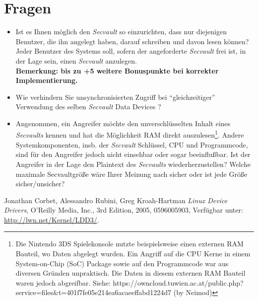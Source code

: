 \documentclass{article}
\begin{document}
\section*{Fragen}
\begin{itemize}
\item Ist es Ihnen m{\"o}glich den \emph{Secvault} so einzurichten,
  dass nur diejenigen Benutzer, die ihn angelegt haben, darauf
  schreiben und davon lesen k{\"o}nnen? Jeder Benutzer des Systems
  soll, sofern der angeforderte \emph{Secvault} frei ist, in der Lage
  sein, einen \emph{Secvault} anzulegen.\\
  {\bf Bemerkung: bis zu +5 weitere Bonuspunkte bei korrekter
    Implementierung.}
\item Wie verhindern Sie unsynchronisierten Zugriff bei
  "`gleichzeitiger"' Verwendung des selben \emph{Secvault} Data
  Devices ?
\item Angenommen, ein Angreifer m{\"o}chte den unverschl{\"u}sselten
  Inhalt eines \emph{Secvaults} kennen und hat die M{\"o}glichkeit RAM direkt
  auszulesen\footnote{
    Die Nintendo 3DS Spielekonsole nutzte beispielsweise einen externen
    RAM Bauteil, wo Daten abgelegt wurden. Ein Angriff auf die CPU Kerne
    in einem System-on-Chip (SoC) Package sowie auf den Programmcode war
    aus diversen Gr{\"u}nden unpraktisch. Die Daten in diesem externen
  RAM Bauteil waren jedoch abgreifbar. Siehe:
  https://owncloud.tuwien.ac.at/public.php?service=files\&t=401f7fe05e214ea6acaeeffabd1224d7
(by Neimod)}. Andere Systemkomponenten, insb. der \emph{Secvault} Schl{\"u}ssel,
CPU und Programmcode, sind f{\"u}r den Angreifer jedoch nicht einsehbar
oder sogar beeinflu{\ss}bar. Ist der Angreifer in der Lage den Plaintext
des \emph{Secvaults} wiederherzustellen? Welche maximale Secvaultgr{\"o}{\ss}e
w{\"a}re Ihrer Meinung nach sicher oder ist jede Gr{\"o}{\ss}e sicher/unsicher?
\end{itemize}


\begin{thebibliography}{9}

    Jonathan Corbet, Alessandro Rubini, Greg Kroah-Hartman
    \emph{Linux Device Drivers},
    O'Reilly Media, Inc.,
    3rd Edition,
    2005,
    0596005903,
    Verf{\"u}gbar unter: \url{http://lwn.net/Kernel/LDD3/}.

\end{thebibliography}
\end{document}
